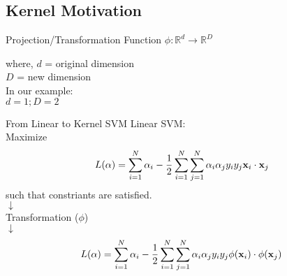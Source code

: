 \documentclass{beamer}
\begin{document}
\subsection{Kernel Motivation}

{
	
}

\begin{frame}{Projection/Transformation Function}
	        $\phi : \mathbb{R}^{d} \rightarrow \mathbb{R}^{D}$
	    
	    where, $d$ = original dimension \\
	    \hspace{1cm} $D$ = new dimension \\
	    In our example:\\
	    \hspace{1cm} $d = 1; D = 2$ 
	\end{frame}
	\begin{frame}{From Linear to Kernel SVM}
	    Linear SVM:\\
	    \hspace{1cm} Maximize\\
	    \begin{equation*}
	        L(\alpha) = \sum_{i=1}^{N}\alpha_{i} - \frac{1}{2}\sum_{i=1}^{N}\sum_{j=1}^{N}\alpha_{i}\alpha_{j}y_{i}y_{j}\mathbf{x}_{i} \cdot \mathbf{x}_{j}
	    \end{equation*}
	    \hspace{1cm} such that constriants are satisfied.\\
	   \hspace{5cm} $\downarrow$\\
	   \hspace{3.8cm} Transformation ($\phi$)\\
	   \hspace{5cm} $\downarrow$\\
	   \begin{equation*}
	       L(\alpha) = \sum_{i=1}^{N}\alpha_{i} - \frac{1}{2}\sum_{i=1}^{N}\sum_{j=1}^{N}\alpha_{i}\alpha_{j}y_{i}y_{j}\phi(\mathbf{x}_{i}) \cdot \phi(\mathbf{x}_{j})
	   \end{equation*}
	\end{frame}
\end{document}
